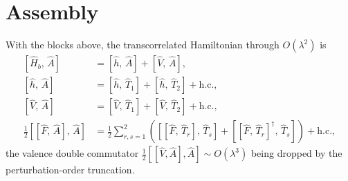 \documentclass[11pt]{article}
\begin{document}
\section{Assembly}
With the blocks above, the transcorrelated Hamiltonian through $O(\lambda^2)$ is
\begin{align}
\left[\hat{H}_b,\, \hat{A}\right] &= \left[\hat{h},\, \hat{A}\right] + \left[\hat{V},\, \hat{A}\right], \\
\left[\hat{h},\, \hat{A}\right] &= \left[\hat{h},\, \hat{T}_1\right] + \left[\hat{h},\, \hat{T}_2\right] + \mathrm{h.c.}, \\
\left[\hat{V},\, \hat{A}\right] &= \left[\hat{V},\, \hat{T}_1\right] + \left[\hat{V},\, \hat{T}_2\right] + \mathrm{h.c.}, \\
\tfrac{1}{2}\left[\left[\hat{F},\, \hat{A}\right],\, \hat{A}\right] &= \tfrac{1}{2}\sum_{r,s=1}^{2}\left( \left[\left[\hat{F},\, \hat{T}_r\right],\, \hat{T}_s\right] + \left[\left[\hat{F},\, \hat{T}_r\right]^{\dagger},\, \hat{T}_s\right]\right) + \mathrm{h.c.},
\end{align}
the valence double commutator $\tfrac{1}{2}[[\hat{V}, \hat{A}], \hat{A}] \sim O(\lambda^3)$ being dropped by the perturbation-order truncation.
\end{document}
